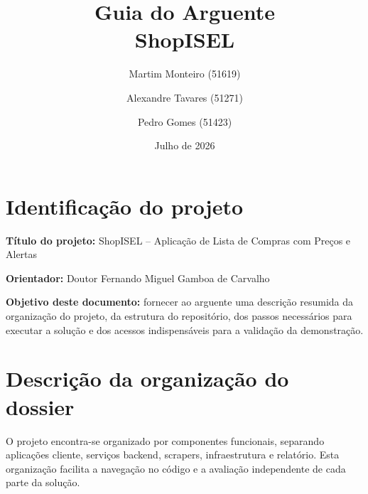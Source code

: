 \documentclass[a4paper,11pt]{article}
\title{\textbf{Guia do Arguente}\\[4pt]\large ShopISEL}
\author{
    Martim Monteiro (51619) \and
    Alexandre Tavares (51271) \and
    Pedro Gomes (51423)
}
\date{Julho de 2026}
\begin{document}
\maketitle
\thispagestyle{empty}

\section{Identifica\c{c}\~ao do projeto}

\textbf{T\'itulo do projeto:} ShopISEL -- Aplica\c{c}\~ao de Lista de Compras com Pre\c{c}os e Alertas

\textbf{Orientador:} Doutor Fernando Miguel Gamboa de Carvalho

\textbf{Objetivo deste documento:} fornecer ao arguente uma descri\c{c}\~ao resumida da organiza\c{c}\~ao do projeto, da estrutura do reposit\'orio, dos passos necess\'arios para executar a solu\c{c}\~ao e dos acessos indispens\'aveis para a valida\c{c}\~ao da demonstra\c{c}\~ao.

\section{Descri\c{c}\~ao da organiza\c{c}\~ao do dossier}

O projeto encontra-se organizado por componentes funcionais, separando aplica\c{c}\~oes cliente, servi\c{c}os backend, scrapers, infraestrutura e relat\'orio. Esta organiza\c{c}\~ao facilita a navega\c{c}\~ao no c\'odigo e a avalia\c{c}\~ao independente de cada parte da solu\c{c}\~ao.
\end{document}
